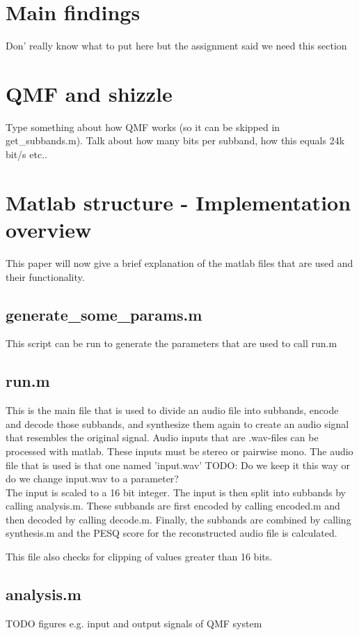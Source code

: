 \documentclass[a4paper]{article}
\begin{document}
\section{Main findings}
Don' really know what to put here but the assignment said we need this section

\section{QMF and shizzle}
Type something about how QMF works (so it can be skipped in get\_subbands.m). Talk about how many bits per subband, how this equals 24k bit/s etc..

\section{Matlab structure - Implementation overview}
This paper will now give a brief explanation of the matlab files that are used and their functionality.

\subsection{generate\_some\_params.m}
This script can be run to generate the parameters that are used to call run.m

\subsection{run.m}
This is the main file that is used to divide an audio file into subbands, encode and decode those subbands, and synthesize them again to create an audio signal that resembles the original signal. Audio inputs that are .wav-files can be processed with matlab. These inputs must be stereo or pairwise mono. The audio file that is used is that one named 'input.wav' TODO: Do we keep it this way or do we change input.wav to a parameter? 
\\
The input is scaled to a 16 bit integer. The input is then split into subbands by calling analysis.m. These subbands are first encoded by calling encoded.m and then decoded by calling decode.m. Finally, the subbands are combined by calling synthesis.m and the PESQ score for the reconstructed audio file is calculated.

This file also checks for clipping of values greater than 16 bits.

\subsection{analysis.m}
TODO figures e.g. input and output signals of QMF system
\end{document}
